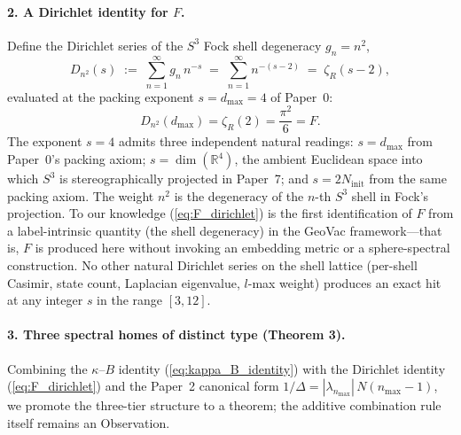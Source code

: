 \documentclass[aps,pra,twocolumn,superscriptaddress,longbibliography]{revtex4-2}
\begin{document}
\paragraph{2. A Dirichlet identity for $F$.}
Define the Dirichlet series of the $S^3$ Fock shell degeneracy
$g_n = n^2$,
\begin{equation}
  D_{n^2}(s) \;:=\; \sum_{n=1}^{\infty} g_n\, n^{-s}
             \;=\; \sum_{n=1}^{\infty} n^{-(s-2)}
             \;=\; \zeta_R(s - 2),
  \label{eq:Dn2_def}
\end{equation}
evaluated at the packing exponent $s = d_{\max} = 4$ of Paper~0:
\begin{equation}
  D_{n^2}(d_{\max}) = \zeta_R(2) = \frac{\pi^2}{6} = F.
  \label{eq:F_dirichlet}
\end{equation}
The exponent $s = 4$ admits three independent natural readings:
$s = d_{\max}$ from Paper~0's packing axiom; $s = \dim(\mathbb{R}^4)$,
the ambient Euclidean space into which $S^3$ is stereographically
projected in Paper~7; and $s = 2 N_{\mathrm{init}}$ from the same
packing axiom.  The weight $n^2$ is the degeneracy of the $n$-th
$S^3$ shell in Fock's projection.  To our knowledge
(\ref{eq:F_dirichlet}) is the first identification of $F$ from a
label-intrinsic quantity (the shell degeneracy) in the GeoVac framework---that is, $F$ is
produced here without invoking an embedding metric or a
sphere-spectral construction.  No other natural Dirichlet series
on the shell lattice (per-shell Casimir, state count, Laplacian
eigenvalue, $l$-max weight) produces an exact hit at any integer
$s$ in the range $[3, 12]$.

\paragraph{3. Three spectral homes of distinct type (Theorem 3).}
Combining the $\kappa$--$B$ identity (\ref{eq:kappa_B_identity})
with the Dirichlet identity (\ref{eq:F_dirichlet}) and the
Paper~2 canonical form
$1/\Delta = |\lambda_{n_{\max}}|\, N(n_{\max}{-}1)$, we promote the
three-tier structure to a theorem; the additive combination rule
itself remains an Observation.
\end{document}
